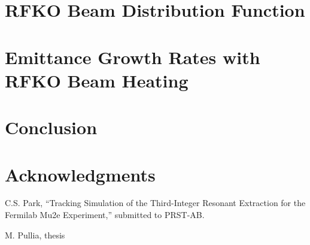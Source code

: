 \documentclass[aps,prstab,onecolumn,preprint,endfloats]{revtex4-1}
\begin{document}
\section{\label{sec:rfko}RFKO Beam Distribution Function}

\section{\label{sec:emit}Emittance Growth Rates with RFKO Beam Heating}

\section{\label{sec:conclusion}Conclusion}

\section{\label{thanks}Acknowledgments}

\begin{thebibliography}{77}

  C.S. Park, ``Tracking Simulation of the Third-Integer Resonant Extraction for the Fermilab Mu2e Experiment,'' submitted to PRST-AB.

  M. Pullia, thesis

\end{thebibliography}

\clearpage
\end{document}

